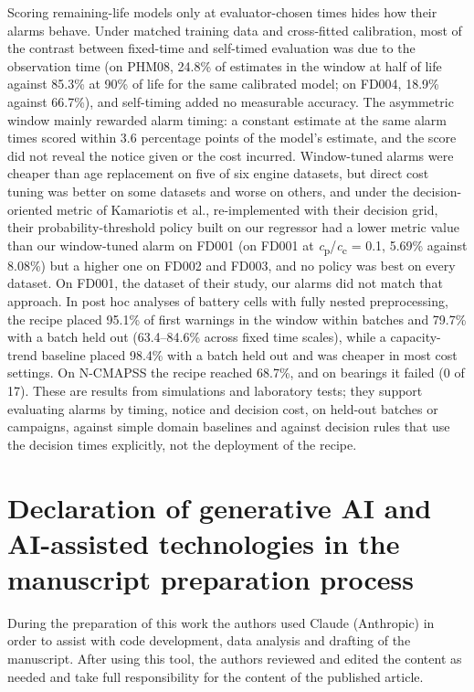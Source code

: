 \documentclass[a4paper,fleqn,doubleblind]{cas-dc}
\begin{document}
Scoring remaining-life models only at evaluator-chosen times hides how their alarms behave. Under matched training data and cross-fitted calibration, most of the contrast between fixed-time and self-timed evaluation was due to the observation time (on PHM08, 24.8\% of estimates in the window at half of life against 85.3\% at 90\% of life for the same calibrated model; on FD004, 18.9\% against 66.7\%), and self-timing added no measurable accuracy. The asymmetric window mainly rewarded alarm timing: a constant estimate at the same alarm times scored within 3.6 percentage points of the model's estimate, and the score did not reveal the notice given or the cost incurred. Window-tuned alarms were cheaper than age replacement on five of six engine datasets, but direct cost tuning was better on some datasets and worse on others, and under the decision-oriented metric of Kamariotis et al., re-implemented with their decision grid, their probability-threshold policy built on our regressor had a lower metric value than our window-tuned alarm on FD001 (on FD001 at \textit{c}\textsubscript{p}/\textit{c}\textsubscript{c} = 0.1, 5.69\% against 8.08\%) but a higher one on FD002 and FD003, and no policy was best on every dataset. On FD001, the dataset of their study, our alarms did not match that approach. In post hoc analyses of battery cells with fully nested preprocessing, the recipe placed 95.1\% of first warnings in the window within batches and 79.7\% with a batch held out (63.4--84.6\% across fixed time scales), while a capacity-trend baseline placed 98.4\% with a batch held out and was cheaper in most cost settings. On N-CMAPSS the recipe reached 68.7\%, and on bearings it failed (0 of 17). These are results from simulations and laboratory tests; they support evaluating alarms by timing, notice and decision cost, on held-out batches or campaigns, against simple domain baselines and against decision rules that use the decision times explicitly, not the deployment of the recipe.

\section*{Declaration of generative AI and AI-assisted technologies in the manuscript preparation process}

\noindent During the preparation of this work the authors used Claude (Anthropic) in order to assist with code development, data analysis and drafting of the manuscript. After using this tool, the authors reviewed and edited the content as needed and take full responsibility for the content of the published article.
\end{document}

